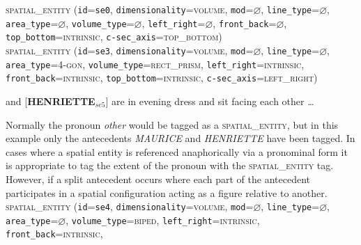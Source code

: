 \documentclass[11pt]{article}
\newcommand{\entity}[2]{[\textbf{\color{darkblue}#1}$_{se#2}$]}
\newenvironment{note}
{\list{}
 {\setlength
  {\itemindent}
  {\listparindent}}
   \item[\textbf{Note:}]\relax}
{\endlist}
\begin{document}
{\begin{note}
        \end{note}
        \textsc{spatial\_entity}
            (\texttt{id}=\texttt{se0},
            \texttt{dimensionality}=\textsc{volume},
            \texttt{mod}=$\varnothing$,
            \texttt{line\_type}=$\varnothing$,\\
            \texttt{area\_type}=$\varnothing$,
            \texttt{volume\_type}=$\varnothing$,
            \texttt{left\_right}=$\varnothing$,
            \texttt{front\_back}=$\varnothing$,\\
            \texttt{top\_bottom}=\textsc{intrinsic},
            \texttt{c-sec\_axis}=\textsc{top\_bottom})\vspace{0.5em}\\
        \textsc{spatial\_entity}
            (\texttt{id}=\texttt{se3},
            \texttt{dimensionality}=\textsc{volume},
            \texttt{mod}=$\varnothing$,
            \texttt{line\_type}=$\varnothing$,\\
            \texttt{area\_type}=\textsc{4-gon},
            \texttt{volume\_type}=\textsc{rect\_prism},
            \texttt{left\_right}=\textsc{intrinsic},\\
            \texttt{front\_back}=\textsc{intrinsic},
            \texttt{top\_bottom}=\textsc{intrinsic},
            \texttt{c-sec\_axis}=\textsc{left\_right})
        \label{ex:sofa}
	\item \entity{MAURICE}{4} and \entity{HENRIETTE}{5} are in evening dress and sit facing each other \ldots
    \begin{note}
        Normally the pronoun \emph{other} would be tagged as a \textsc{spatial\_entity}, but in this example only the antecedents \emph{MAURICE} and \emph{HENRIETTE} have been tagged. In cases where a spatial entity is referenced anaphorically via a pronominal form it is appropriate to tag the extent of the pronoun with the \textsc{spatial\_entity} tag. However, if a split antecedent occurs where each part of the antecedent participates in a spatial configuration acting as a figure relative to another.
    \end{note}
        \textsc{spatial\_entity}
            (\texttt{id}=\texttt{se4},
            \texttt{dimensionality}=\textsc{volume},
            \texttt{mod}=$\varnothing$,
            \texttt{line\_type}=$\varnothing$,\\
            \texttt{area\_type}=$\varnothing$,
            \texttt{volume\_type}=\textsc{biped},
            \texttt{left\_right}=\textsc{intrinsic},
            \texttt{front\_back}=\textsc{intrinsic},\\
}
\end{document}
